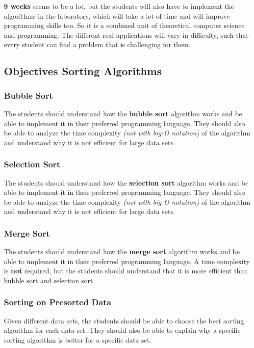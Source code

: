 \documentclass[10pt, oneside]{article}
\theoremstyle{remark}
\begin{document}
\textbf{9 weeks} seems to be a lot, but the students will also have to implement the algorithms in the laboratory, which will take a lot of time and will improve programming skills too. So it is a combined unit of theoretical computer science and programming. The different real applications will vary in difficulty, such that every student can find a problem that is challenging for them.

\subsection{Objectives Sorting Algorithms}

\subsubsection{Bubble Sort}
The students should understand how the \textbf{bubble sort} algorithm works and be able to implement it in their preferred programming language. They should also be able to analyze the time complexity \textit{(not with big-O notation)} of the algorithm and understand why it is not efficient for large data sets.

\subsubsection{Selection Sort}
The students should understand how the \textbf{selection sort} algorithm works and be able to implement it in their preferred programming language. They should also be able to analyze the time complexity \textit{(not with big-O notation)} of the algorithm and understand why it is not efficient for large data sets.

\subsubsection{Merge Sort}
The students should understand how the \textbf{merge sort} algorithm works and be able to implement it in their preferred programming language. A time complexity is \textbf{not} required, but the students should understand that it is more efficient than bubble sort and selection sort.

\subsubsection{Sorting on Presorted Data}
Given different data sets, the students should be able to choose the best sorting algorithm for each data set. They should also be able to explain why a specific sorting algorithm is better for a specific data set.
\end{document}
